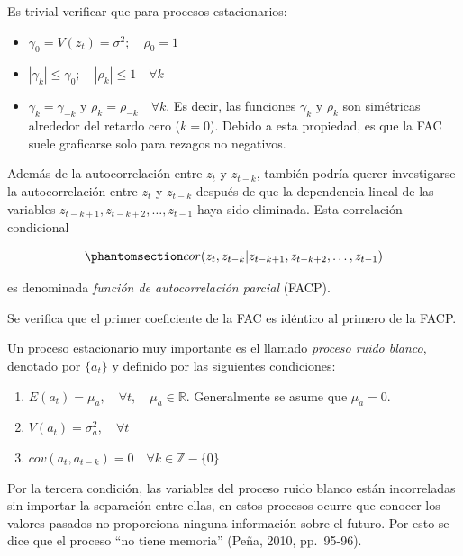 \documentclass[12pt]{article}
\providecommand{\tightlist}{%
  \setlength{\itemsep}{0pt}\setlength{\parskip}{0pt}}\usepackage{longtable,booktabs,array}
\begin{document}
Es trivial verificar que para procesos estacionarios:

\begin{itemize}
\tightlist
\item
  \(\gamma_0 = V(z_t) = \sigma^2; \quad \rho_0 = 1\)
\item
  \(|\gamma_k| \leq \gamma_0; \quad |\rho_k| \leq 1 \quad \forall k\)
\item
  \(\gamma_k = \gamma_{-k}\) y \(\rho_k = \rho_{-k} \quad \forall k\).
  Es decir, las funciones \(\gamma_k\) y \(\rho_k\) son simétricas
  alrededor del retardo cero (\(k=0\)). Debido a esta propiedad, es que
  la FAC suele graficarse solo para rezagos no negativos.
\end{itemize}

Además de la autocorrelación entre \(z_t\) y \(z_{t-k}\), también podría
querer investigarse la autocorrelación entre \(z_t\) y \(z_{t-k}\)
después de que la dependencia lineal de las variables
\(z_{t-k+1}, z_{t-k+2}, \dots, z_{t-1}\) haya sido eliminada. Esta
correlación condicional

\begin{equation}\phantomsection\label{eq-pacf}{cor(z_t, z_{t-k} | z_{t-k+1}, z_{t-k+2}, \dots, z_{t-1})}\end{equation}

es denominada \emph{función de autocorrelación parcial} (FACP).

Se verifica que el primer coeficiente de la FAC es idéntico al primero
de la FACP.

Un proceso estacionario muy importante es el llamado \emph{proceso ruido
blanco}, denotado por \(\{a_t\}\) y definido por las siguientes
condiciones:

\begin{enumerate}
\def\labelenumi{\arabic{enumi}.}
\tightlist
\item
  \(E(a_t) = \mu_a, \quad \forall t, \quad \mu_a \in \mathbb{R}\).
  Generalmente se asume que \(\mu_a = 0\).
\item
  \(V(a_t) = \sigma^2_a, \quad \forall t\)
\item
  \(cov(a_t, a_{t-k}) = 0 \quad \forall k \in \mathbb{Z} - \{0\}\)
\end{enumerate}

Por la tercera condición, las variables del proceso ruido blanco están
incorreladas sin importar la separación entre ellas, en estos procesos
ocurre que conocer los valores pasados no proporciona ninguna
información sobre el futuro. Por esto se dice que el proceso ``no tiene
memoria'' (Peña, 2010, pp.~95-96).
\end{document}
